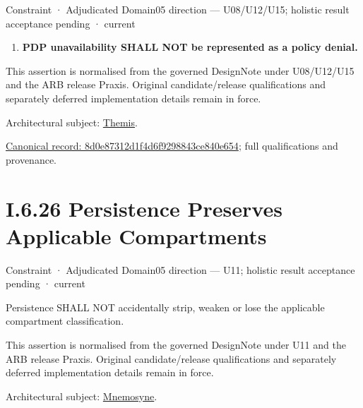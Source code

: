 \label{element:8d0e87312d1f4d6f9298843ce840e654}
{\small Constraint · Adjudicated Domain05 direction — U08/U12/U15; holistic result acceptance pending · current}\par

\begin{enumerate}


\item \textbf{PDP unavailability SHALL NOT be represented as a policy denial.}

\end{enumerate}


This assertion is normalised from the governed DesignNote under U08/U12/U15 and the ARB release Praxis. Original candidate/release qualifications and separately deferred implementation details remain in force.



Architectural subject: \hyperref[element:899d34ec491948b68aad09e507dea6d1]{Themis}.


{\footnotesize \href{../../../../../../../../continuum/motivation/constraint/8d0e87312d1f4d6f9298843ce840e654.md}{Canonical record: 8d0e87312d1f4d6f9298843ce840e654}; full qualifications and provenance.}\par
\section*{I.6.26 Persistence Preserves Applicable Compartments}
\label{navigation:I.6.26}

\label{element:6e963678cf6f4c3488c798d6afc3b910}
{\small Constraint · Adjudicated Domain05 direction — U11; holistic result acceptance pending · current}\par

Persistence SHALL NOT accidentally strip, weaken or lose the applicable compartment classification.



This assertion is normalised from the governed DesignNote under U11 and the ARB release Praxis. Original candidate/release qualifications and separately deferred implementation details remain in force.



Architectural subject: \hyperref[element:7985e647bf9e4ca3ba70faf9e3e4ae02]{Mnemosyne}.


